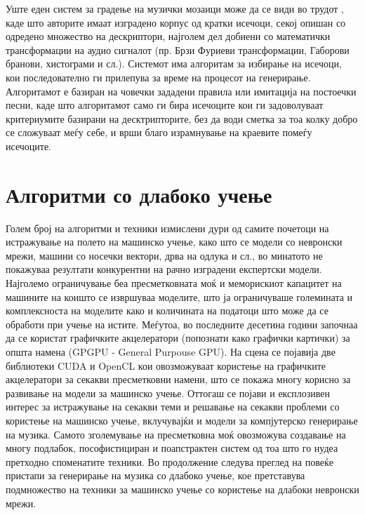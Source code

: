 Уште еден систем за градење на музички мозаици може да се види во трудот \cite{Schwarz2006}, каде што авторите имаат изградено корпус од кратки исечоци, секој опишан со одредено множество на дескриптори, најголем дел добиени со математички трансформации на аудио сигналот (пр. Брзи Фуриеви трансформации, Габорови бранови, хистограми и сл.). Системот има алгоритам за избирање на исечоци, кои последователно ги прилепува за време на процесот на генерирање. Алгоритамот е базиран на човечки зададени правила или имитација на постоечки песни, каде што алгоритамот само ги бира исечоците кои ги задоволуваат критериумите базирани на десктрипторите, без да води сметка за тоа колку добро се сложуваат меѓу себе, и врши благо израмнување на краевите помеѓу исечоците.

\section{Алгоритми со длабоко учење} 

Голем број на алгоритми и техники измислени дури од самите почетоци на истражување на полето на машинско учење, како што се модели со невронски мрежи, машини со носечки вектори, дрва на одлука и сл., во минатото не покажуваа резултати конкурентни на рачно изградени експертски модели. Најголемо ограничување беа пресметковната моќ и меморискиот капацитет на машините на коишто се извршуваа моделите, што ја ограничуваше големината и комплексноста на моделите како и количината на податоци што може да се обработи при учење на истите. Меѓутоа, во последните десетина години започнаа да се користат графичките акцелератори (попознати како графички картички) за општа намена (GPGPU - General Purpouse GPU). На сцена се појавија две библиотеки CUDA и OpenCL кои овозможуваат користење на графичките акцелератори за секакви пресметковни намени, што се покажа многу корисно за развивање на модели за машинско учење. Оттогаш се појави и експлозивен интерес за истражување на секакви теми и решавање на секакви проблеми со користење на машинско учење, вклучувајќи и модели за компјутерско генерирање на музика. Самото зголемување на пресметковна моќ овозможува создавање на многу подлабок, пософистициран и поапстрактен систем од тоа што го нудеа претходно споменатите техники. Во продолжение следува преглед на повеќе пристапи за генерирање на музика со длабоко учење, кое претставува подмножество на техники за машинско учење со користење на длабоки невронски мрежи.

